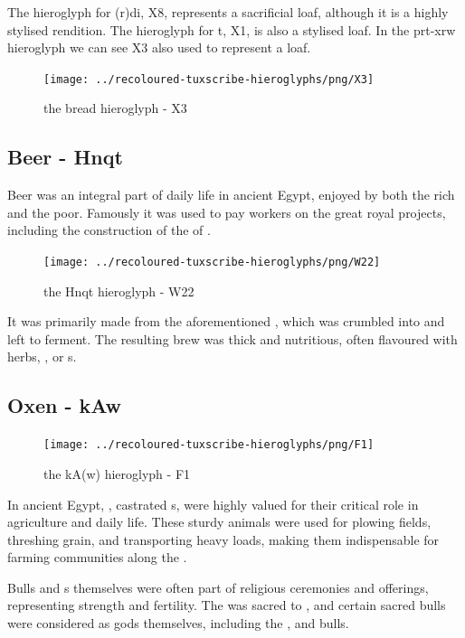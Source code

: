 The hieroglyph for (r)di, X8, represents a sacrificial loaf, although it is a highly stylised rendition. The hieroglyph for t, X1, is also a stylised loaf. In the prt-xrw hieroglyph we can see X3 also used to represent a loaf.

\begin{figure} [H]
	\centering
	\texttt{[image: ../recoloured-tuxscribe-hieroglyphs/png/X3]}
	\caption{the bread hieroglyph - X3}
\end{figure}

\subsection*{Beer - Hnqt}

Beer was an integral part of daily life in ancient Egypt, enjoyed by both the rich and the poor. Famously it was used to pay workers on the great royal projects, including the construction of the  of .

\begin{figure} [H]
	\centering
	\texttt{[image: ../recoloured-tuxscribe-hieroglyphs/png/W22]}
	\caption{the Hnqt hieroglyph - W22}
\end{figure}

It was primarily made from the aforementioned , which was crumbled into  and left to ferment. The resulting brew was thick and nutritious, often flavoured with herbs, , or s.

\subsection*{Oxen - kAw}

\begin{figure} [H]
	\centering
	\texttt{[image: ../recoloured-tuxscribe-hieroglyphs/png/F1]}
	\caption{the kA(w) hieroglyph - F1}
\end{figure}

In ancient Egypt, , castrated s, were highly valued for their critical role in agriculture and daily life. These sturdy animals were used for plowing fields, threshing grain, and transporting heavy loads, making them indispensable for farming communities along the .

Bulls and s themselves were often part of religious ceremonies and offerings, representing strength and fertility. The  was sacred to , and certain sacred bulls were considered as gods themselves, including the ,  and  bulls.

